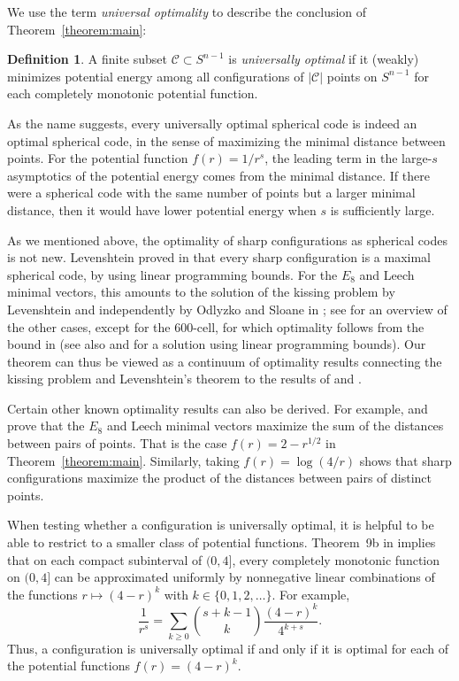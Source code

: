 \documentclass{jams-l}
\theoremstyle{plain}
\numberwithin{theorem}{section}
\theoremstyle{definition}
\newtheorem{definition}[theorem]{Definition}
\numberwithin{equation}{section}
\newcommand{\CodeS}{\mathcal{C}}
\begin{document}
We use the term \textit{universal optimality\/} to describe the
conclusion of Theorem~\ref{theorem:main}:

\begin{definition}
A finite subset $\CodeS \subset S^{n-1}$ is \textit{universally
optimal\/} if it (weakly) minimizes potential energy among all
configurations of $|\CodeS|$ points on $S^{n-1}$ for each
completely monotonic potential function.
\end{definition}

As the name suggests, every universally optimal spherical code is
indeed an optimal spherical code, in the sense of maximizing the
minimal distance between points. For the potential function $f(r)
= 1/r^s$, the leading term in the large-$s$ asymptotics of the
potential energy comes from the minimal distance. If there were a
spherical code with the same number of points but a larger minimal
distance, then it would have lower potential energy when $s$ is
sufficiently large.

As we mentioned above, the optimality of sharp configurations as
spherical codes is not new. Levenshtein proved in \cite{L2} that
every sharp configuration is a maximal spherical code, by using
linear programming bounds.  For the $E_8$ and Leech minimal
vectors, this amounts to the solution of the kissing problem by
Levenshtein and independently by Odlyzko and Sloane in
\cite{L,OS}; see \cite{L3} for an overview of the other cases,
except for the $600$-cell, for which optimality follows from the
bound in \cite{B} (see also \cite{A3} and \cite{E} for a solution
using linear programming bounds).  Our theorem can thus be viewed
as a continuum of optimality results connecting the kissing
problem and Levenshtein's theorem to the results of \cite{KY1} and
\cite{A2}.

Certain other known optimality results can also be derived.  For
example, \cite{KY1} and \cite{A2} prove that the $E_8$ and Leech
minimal vectors maximize the sum of the distances between pairs of
points. That is the case $f(r)=2-r^{1/2}$ in
Theorem~\ref{theorem:main}.  Similarly, taking $f(r) = \log(4/r)$
shows that sharp configurations maximize the product of the
distances between pairs of distinct points.

When testing whether a configuration is universally optimal, it is
helpful to be able to restrict to a smaller class of potential
functions.  Theorem~9b in \cite[p.~154]{W} implies that on each
compact subinterval of $(0,4]$, every completely monotonic
function on $(0,4]$ can be approximated uniformly by nonnegative
linear combinations of the functions $r \mapsto (4-r)^k$ with $k
\in \{0,1,2,\dots\}$.  For example,
$$
\frac{1}{r^s} = \sum_{k \ge 0}
\binom{s+k-1}{k}\frac{(4-r)^k}{4^{k+s}}.
$$
Thus, a configuration is universally optimal if and only if it is
optimal for each of the potential functions $f(r) = (4-r)^k$.
\end{document}
